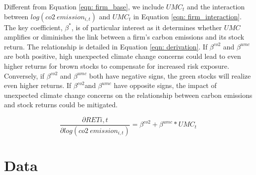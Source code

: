 \documentclass[12pt]{article}
\begin{document}
\noindent Different from Equation \ref{eqn: firm_base}, we include $UMC_{t}$ and the interaction between $log(co2 \: emission_{i, t})$ and $UMC_t$ in Equation \ref{eqn: firm_interaction}. The key coefficient, $\beta^*$, is of particular interest as it determines whether $UMC$ amplifies or diminishes the link between a firm's carbon emissions and its stock return. The relationship is detailed in Equation \ref{eqn: derivation}. If $\beta^{co2}$ and $\beta^{umc}$ are both positive, high unexpected climate change concerns could lead to even higher returns for brown stocks to compensate for increased risk exposure. Conversely, if $\beta^{co2}$ and $\beta^{umc}$ both have negative signs, the green stocks will realize even higher returns. If $\beta^{co2}$and $\beta^{umc}$ have opposite signs, the impact of unexpected climate change concerns on the relationship between carbon emissions and stock returns could be mitigated.

\begin{equation}
\label{eqn: derivation}
\frac{\partial RET{i, t}}{\partial log(co2 \: emission_{i, t})} = \beta^{co2} + \beta^{umc}*UMC_{t}
\end{equation}
\section{Data} \label{sec: data}
\end{document}
